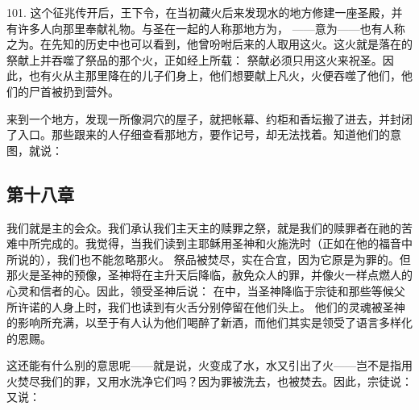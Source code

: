 101. 这个征兆传开后，王下令，在当初藏火后来发现水的地方修建一座圣殿，并有许多人向那里奉献礼物。与圣在一起的人称那地方为， ——意为——也有人称之为。在先知的历史中也可以看到，他曾吩咐后来的人取用这火。这火就是落在的祭献上并吞噬了祭品的那个火，正如经上所载：  祭献必须只用这火来祝圣。因此，也有火从主那里降在的儿子们身上，他们想要献上凡火，火便吞噬了他们，他们的尸首被扔到营外。\par

来到一个地方，发现一所像洞穴的屋子，就把帐幕、约柜和香坛搬了进去，并封闭了入口。那些跟来的人仔细查看那地方，要作记号，却无法找着。知道他们的意图，就说： \par


\subsection{第十八章}

\par

我们就是主的会众。我们承认我们主天主的赎罪之祭，就是我们的赎罪者在祂的苦难中所完成的。我觉得，当我们读到主耶稣用圣神和火施洗时（正如在他的福音中所说的），我们也不能忽略那火。 祭品被焚尽，实在合宜，因为它原是为罪的。但那火是圣神的预像，圣神将在主升天后降临，赦免众人的罪，并像火一样点燃人的心灵和信者的心。因此，领受圣神后说：  在中，当圣神降临于宗徒和那些等候父所许诺的人身上时，我们也读到有火舌分别停留在他们头上。 他们的灵魂被圣神的影响所充满，以至于有人认为他们喝醉了新酒，而他们其实是领受了语言多样化的恩赐。\par

这还能有什么别的意思呢——就是说，火变成了水，水又引出了火——岂不是指用火焚尽我们的罪，又用水洗净它们吗？因为罪被洗去，也被焚去。因此，宗徒说：  又说： \par

